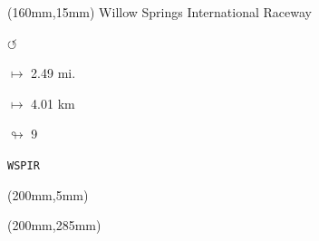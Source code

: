 \begin{textblock*}{40mm}(160mm,15mm)%
Willow Springs International Raceway
\par \Huge$\circlearrowleft$
\Large
\par$\mapsto$ 2.49 mi.
\par$\mapsto$ 4.01 km
\par$\looparrowright$ 9
\par\hfill\tiny\tt WSPIR\\
\end{textblock*}
\begin{textblock*}{20mm}(200mm,5mm)%
\fbox{\thepage}
\end{textblock*}
\begin{textblock*}{20mm}(200mm,285mm)%
\fbox{\thepage}
\end{textblock*}
\null\newpage

